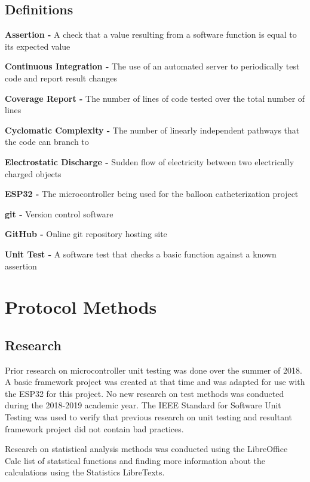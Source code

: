 \documentclass[12pt]{article}
\begin{document}
\subsection{Definitions}
    \begin{deflist}
        \item \textbf{Assertion -} A check that a value resulting from a software function is equal to its expected value
        \item \textbf{Continuous Integration -} The use of an automated server to periodically test code and report result changes
        \item \textbf{Coverage Report -} The number of lines of code tested over the total number of lines
        \item \textbf{Cyclomatic Complexity -} The number of linearly independent pathways that the code can branch to
        \item \textbf{Electrostatic Discharge -} Sudden flow of electricity between two electrically charged objects
        \item \textbf{ESP32 -} The microcontroller being used for the balloon catheterization project
        \item \textbf{git -} Version control software
        \item \textbf{GitHub -} Online git repository hosting site
        \item \textbf{Unit Test -} A software test that checks a basic function against a known assertion
    \end{deflist}

\section{Protocol Methods}
\subsection{Research}
Prior research on microcontroller unit testing was done over the summer of 2018. A basic framework project was created at that time and was adapted for use with the ESP32 for this project. No new research on test methods was conducted during the 2018-2019 academic year. The IEEE Standard for Software Unit Testing was used to verify that previous research on unit testing and resultant framework project did not contain bad practices.

Research on statistical analysis methods was conducted using the LibreOffice Calc list of statstical functions and finding more information about the calculations using the Statistics LibreTexts.
\end{document}
